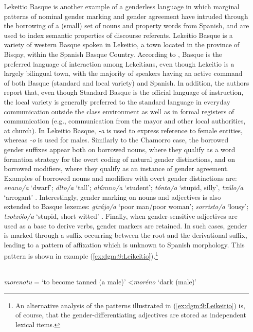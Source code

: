 \documentclass[output=collectionpaper]{langsci/langscibook}
\begin{document}
Lekeitio Basque is another example of a genderless language in which marginal patterns of nominal gender marking and gender agreement have intruded through the borrowing of a (small) set of nouns and property words from Spanish, and are used to index semantic properties of discourse referents. Lekeitio Basque is a variety of western Basque spoken in Lekeitio, a town located in the province of Bisqay, within the Spanish Basque Country. According to \citet[1--2]{Hualde1994}, Basque is the preferred language of interaction among Lekeitians, even though Lekeitio is a largely bilingual town, with the majority of speakers having an active command of both Basque (standard and local variety) and Spanish. In addition, the authors report that, even though Standard Basque is the official language of instruction, the local variety is generally preferred to the standard language in everyday communication outside the class environment as well as in formal registers of communication (e.g., communication from the mayor and other local authorities, at church). In Lekeitio Basque, \textit{-a} is used to express reference to female entities, whereas \textit{-o} is used for males. Similarly to the Chamorro case, the borrowed gender suffixes appear both on borrowed nouns, where they qualify as a word formation strategy for the overt coding of natural gender distinctions, and on borrowed modifiers, where they qualify as an instance of gender agreement. Examples of borrowed nouns and modifiers with overt gender distinctions are: \textit{enano/a} `dwarf'; \textit{\'alto/a} `tall'; \textit{al\'umno/a} `student'; \textit{t\'onto/a} `stupid, silly', \textit{tx\'ulo/a} `arrogant' \citep[108--109]{Hualde1994}. Interestingly, gender marking on nouns and adjectives is also extended to Basque lexemes: \textit{gix\'ajo/a} `poor man/poor woman'; \textit{sorristo/a} `lousy'; \textit{txotx\'olo/a} `stupid, short witted' \citep[109]{Hualde1994}. Finally, when gender-sensitive adjectives are used as a base to derive verbs, gender markers are retained. In such cases, gender is marked through a suffix occurring between the root and the derivational suffix, leading to a pattern of affixation which is unknown to Spanish morphology. This pattern is shown in example (\ref{ex:dgm:9:Leikeitio}).\footnote{An alternative analysis of the patterns illustrated in (\ref{ex:dgm:9:Leikeitio}) is, of course, that the gender-differentiating adjectives are stored as independent lexical items.}

\ea\label{ex:dgm:9:Leikeitio}
\\
\textit{morenotu} = `to become tanned (a male)' \textless \textit{mor\'eno} `dark (male)'
\end{document}
